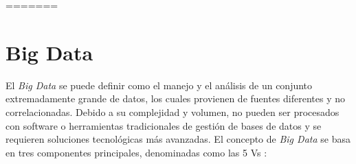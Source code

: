 























=======
\section{Big Data}
\label{sec:bigdata}


El \textit{Big Data} \cite{stab} se puede definir como el manejo y el análisis de un conjunto extremadamente grande de datos, los cuales provienen de fuentes diferentes y no correlacionadas. Debido a su complejidad y volumen, no pueden ser procesados con software o herramientas tradicionales de gestión de bases de datos y se requieren soluciones tecnológicas más avanzadas. El concepto de \textit{Big Data} se basa en tres componentes principales, denominadas como las 5 Vs \cite{5vs} \cite{5vs2}:

